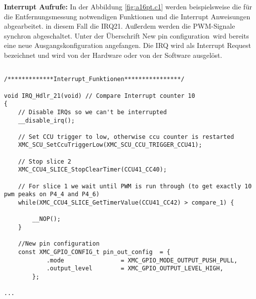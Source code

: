 \textbf{Interrupt Aufrufe:}
In der Abbildung \ref{fig:a16pt.c1} werden beispielsweise die für die Entfernungsmessung notwendigen Funktionen und die Interrupt Anweisungen abgearbeitet. in diesem Fall die IRQ21. Außerdem werden die PWM-Signale synchron abgeschaltet. Unter der Überschrift \glqq New pin configuration\grqq~wird bereits eine neue Ausgangskonfiguration angefangen. Die IRQ wird als Interrupt Request bezeichnet und wird von der Hardware oder von der Software ausgelöst.
\\
\begin{minipage}{1\textwidth}
\begin{lstlisting}

/*************Interrupt_Funktionen****************/

void IRQ_Hdlr_21(void) // Compare Interrupt counter 10
{
	// Disable IRQs so we can't be interrupted
	__disable_irq();

	// Set CCU trigger to low, otherwise ccu counter is restarted
	XMC_SCU_SetCcuTriggerLow(XMC_SCU_CCU_TRIGGER_CCU41);

	// Stop slice 2
	XMC_CCU4_SLICE_StopClearTimer(CCU41_CC40);

	// For slice 1 we wait until PWM is run through (to get exactly 10 pwm peaks on P4_4 and P4_6)
	while(XMC_CCU4_SLICE_GetTimerValue(CCU41_CC42) > compare_1) {

		__NOP();
	}
	
	//New pin configuration
	const XMC_GPIO_CONFIG_t pin_out_config	= {
			.mode                = XMC_GPIO_MODE_OUTPUT_PUSH_PULL,
			.output_level        = XMC_GPIO_OUTPUT_LEVEL_HIGH,
		};

...
\end{lstlisting}
\label{fig:a16pt.c1}
\end{minipage}
